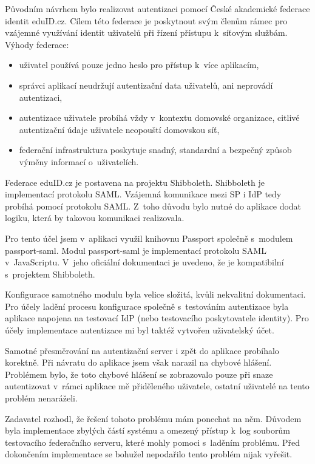 \documentclass[thesis=M,czech]{FITthesis}[2012/06/26]
\begin{document}
      Původním návrhem bylo realizovat autentizaci pomocí České akademické federace identit eduID.cz.
      Cílem této federace je poskytnout svým členům rámec pro vzájemné využívání
      identit uživatelů při řízení přístupu k~síťovým službám.
      Výhody federace\cite{eduid_cz}:
      
      \begin{itemize}
        \item{uživatel používá pouze jedno heslo pro přístup k~více aplikacím,}
        \item{správci aplikací neudržují autentizační data uživatelů, ani neprovádí autentizaci,}
        \item{autentizace uživatele probíhá vždy v~kontextu domovské organizace, citlivé autentizační údaje uživatele neopouští domovskou síť,}
        \item{federační infrastruktura poskytuje snadný, standardní a bezpečný způsob výměny informací o~uživatelích.}
      \end{itemize}

      Federace eduID.cz je postavena na projektu Shibboleth. 
      Shibboleth je implementací protokolu SAML.
      Vzájemná komunikace mezi SP i IdP tedy probíhá pomocí protokolu SAML.
      Z~toho důvodu bylo nutné do aplikace dodat logiku, která by takovou komunikaci realizovala\cite{eduid_cz}.

      Pro tento účel jsem v~aplikaci využil knihovnu Passport společně s~modulem
      passport-saml.
      Modul passport-saml je implementací protokolu SAML v~JavaScriptu.
      V~jeho oficiální dokumentaci je uvedeno, že je kompatibilní s~projektem Shibboleth.

      Konfigurace samotného modulu byla velice složitá,
      kvůli nekvalitní dokumentaci.
      Pro účely ladění procesu konfigurace společně s~testováním autentizace
      byla aplikace napojena na testovací IdP (nebo testovacího poskytovatele identity).
      Pro účely implementace autentizace mi byl taktéž vytvořen uživatelský účet.

      Samotné přesměrování na autentizační server i zpět do aplikace
      probíhalo korektně.
      Při návratu do aplikace jsem však narazil na chybové hlášení.
      Problémem bylo, že toto chybové hlášení se zobrazovalo
      pouze při snaze autentizovat v~rámci aplikace mě přiděleného uživatele,
      ostatní uživatelé na tento problém nenaráželi.

      Zadavatel rozhodl, že řešení tohoto problému mám ponechat na něm.
      Důvodem byla implementace zbylých částí systému a omezený přístup
      k~log souborům testovacího federačního serveru, které mohly pomoci s~laděním problému.
      Před dokončením implementace se bohužel nepodařilo
      tento problém nijak vyřešit.
\end{document}
